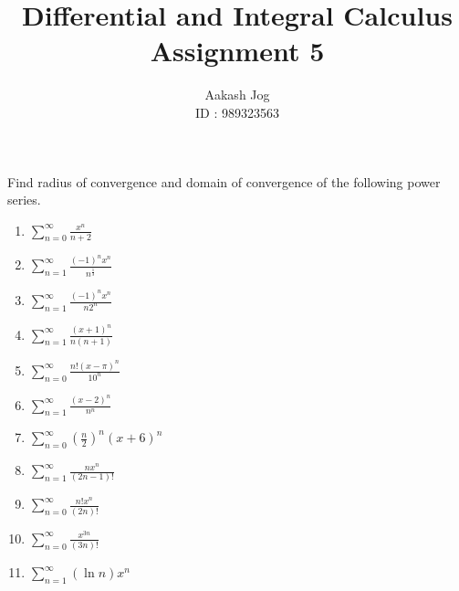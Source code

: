 \documentclass[fleqn, a4paper, 12pt, oneside]{amsart}
\title
{
	Differential and Integral Calculus\\
	Assignment 5
}
\author
{
	Aakash Jog\\
	ID : 989323563
}
\date{\formatdate{7}{5}{2015}}
\theoremstyle{definition}
\theoremstyle{theorem}
\begin{document}
	
\maketitle

\begin{question}
	Find radius of convergence and domain of convergence of the following power series.
	\begin{enumerate}
		\item $\sum\limits_{n = 0}^{\infty} \frac{x^n}{n + 2}$
		\item $\sum\limits_{n = 1}^{\infty} \frac{(-1)^n x^n}{n^{\frac{1}{3}}}$
		\item $\sum\limits_{n = 1}^{\infty} \frac{(-1)^n x^n}{n 2^n}$
		\item $\sum\limits_{n = 1}^{\infty} \frac{(x + 1)^n}{n (n + 1)}$
		\item $\sum\limits_{n = 0}^{\infty} \frac{n! (x - \pi)^n}{10^n}$
		\item $\sum\limits_{n = 1}^{\infty} \frac{(x - 2)^n}{n^n}$
		\item $\sum\limits_{n = 0}^{\infty} \left( \frac{n}{2} \right)^n (x + 6)^n$
		\item $\sum\limits_{n = 1}^{\infty} \frac{n x^n}{(2 n - 1)!}$
		\item $\sum\limits_{n = 0}^{\infty} \frac{n! x^n}{(2 n)!}$
		\item $\sum\limits_{n = 0}^{\infty} \frac{x^{3 n}}{(3 n)!}$
		\item $\sum\limits_{n = 1}^{\infty} (\ln n) x^n$
	\end{enumerate}
\end{question}
\end{document}
